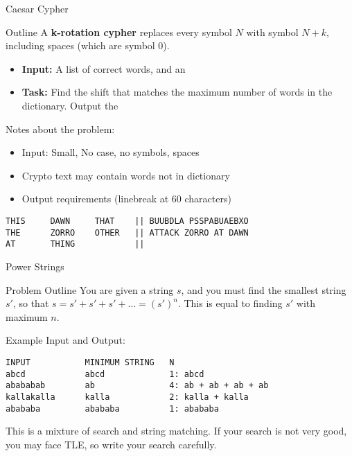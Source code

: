 \begin{frame}[fragile]{Caesar Cypher}
  \begin{exampleblock}{Outline}
    A {\bf k-rotation cypher} replaces every symbol $N$ with symbol $N+k$,
    including spaces (which are symbol 0).
    \begin{itemize}
    \item {\bf Input:} A list of correct words, and an 
    \item {\bf Task:} Find the shift that matches the maximum number of words in the dictionary. Output the 
    \end{itemize}

    \medskip

    Notes about the problem:
    \begin{itemize}
    \item Input: Small, No case, no symbols, spaces
    \item Crypto text may contain words not in dictionary
    \item Output requirements (linebreak at 60 characters)
    \end{itemize}
  \end{exampleblock}

\begin{verbatim}
THIS     DAWN     THAT    || BUUBDLA PSSPABUAEBXO
THE      ZORRO    OTHER   || ATTACK ZORRO AT DAWN
AT       THING            ||
\end{verbatim}
\end{frame}

\begin{frame}[fragile]{Power Strings}
    \begin{exampleblock}{Problem Outline}
      You are given a string $s$, and you must find the smallest string $s'$, so that $s = s'+s'+s'+\ldots = (s')^n$. This is equal to finding $s'$ with maximum $n$.
    \end{exampleblock}
    \bigskip

Example Input and Output:
\begin{verbatim}
INPUT           MINIMUM STRING   N
abcd            abcd             1: abcd
abababab        ab               4: ab + ab + ab + ab
kallakalla      kalla            2: kalla + kalla
abababa         abababa          1: abababa
\end{verbatim}\bigskip

This is a mixture of search and string matching. If your search is not very good, you may face TLE, so write your search carefully.
\end{frame}


